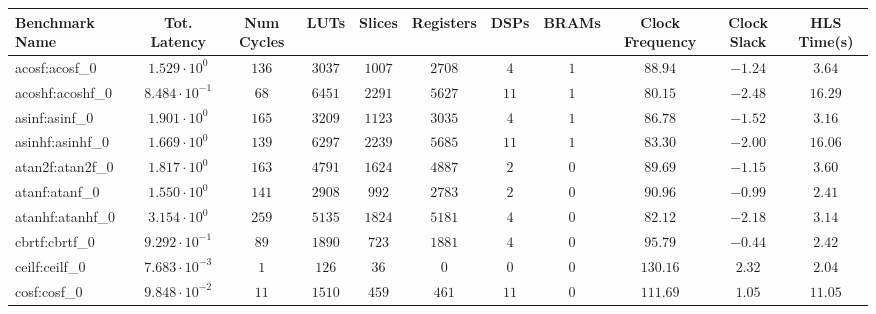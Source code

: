 \begin{tabular}{|l|c|c|c|c|c|c|c|c|c|c|}
\hline
Benchmark Name               & Tot. Latency            & Num Cycles & LUTs       & Slices    & Registers & DSPs    & BRAMs & Clock Frequency & Clock Slack & HLS Time(s) \\
\hline
acosf:acosf\_0               & $ 1.529 \cdot 10^{0}  $ & $ 136    $ & $ 3037   $ & $ 1007  $ & $ 2708  $ & $ 4   $ & $ 1 $ & $ 88.94       $ & $ -1.24   $ & $ 3.64    $ \\
acoshf:acoshf\_0             & $ 8.484 \cdot 10^{-1} $ & $ 68     $ & $ 6451   $ & $ 2291  $ & $ 5627  $ & $ 11  $ & $ 1 $ & $ 80.15       $ & $ -2.48   $ & $ 16.29   $ \\
asinf:asinf\_0               & $ 1.901 \cdot 10^{0}  $ & $ 165    $ & $ 3209   $ & $ 1123  $ & $ 3035  $ & $ 4   $ & $ 1 $ & $ 86.78       $ & $ -1.52   $ & $ 3.16    $ \\
asinhf:asinhf\_0             & $ 1.669 \cdot 10^{0}  $ & $ 139    $ & $ 6297   $ & $ 2239  $ & $ 5685  $ & $ 11  $ & $ 1 $ & $ 83.30       $ & $ -2.00   $ & $ 16.06   $ \\
atan2f:atan2f\_0             & $ 1.817 \cdot 10^{0}  $ & $ 163    $ & $ 4791   $ & $ 1624  $ & $ 4887  $ & $ 2   $ & $ 0 $ & $ 89.69       $ & $ -1.15   $ & $ 3.60    $ \\
atanf:atanf\_0               & $ 1.550 \cdot 10^{0}  $ & $ 141    $ & $ 2908   $ & $ 992   $ & $ 2783  $ & $ 2   $ & $ 0 $ & $ 90.96       $ & $ -0.99   $ & $ 2.41    $ \\
atanhf:atanhf\_0             & $ 3.154 \cdot 10^{0}  $ & $ 259    $ & $ 5135   $ & $ 1824  $ & $ 5181  $ & $ 4   $ & $ 0 $ & $ 82.12       $ & $ -2.18   $ & $ 3.14    $ \\
cbrtf:cbrtf\_0               & $ 9.292 \cdot 10^{-1} $ & $ 89     $ & $ 1890   $ & $ 723   $ & $ 1881  $ & $ 4   $ & $ 0 $ & $ 95.79       $ & $ -0.44   $ & $ 2.42    $ \\
ceilf:ceilf\_0               & $ 7.683 \cdot 10^{-3} $ & $ 1      $ & $ 126    $ & $ 36    $ & $ 0     $ & $ 0   $ & $ 0 $ & $ 130.16      $ & $ 2.32    $ & $ 2.04    $ \\
cosf:cosf\_0                 & $ 9.848 \cdot 10^{-2} $ & $ 11     $ & $ 1510   $ & $ 459   $ & $ 461   $ & $ 11  $ & $ 0 $ & $ 111.69      $ & $ 1.05    $ & $ 11.05   $ \\

\end{tabular}

